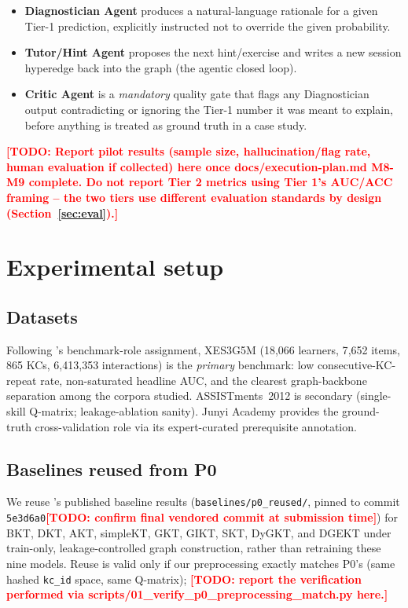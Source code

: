 \documentclass[journal]{IEEEtran}
\newcommand{\todo}[1]{\textcolor{red}{\textbf{[TODO: #1]}}}
\begin{document}
\begin{itemize}
  \item \textbf{Diagnostician Agent} produces a natural-language rationale
  for a given Tier-1 prediction, explicitly instructed not to override the
  given probability.
  \item \textbf{Tutor/Hint Agent} proposes the next hint/exercise and writes
  a new session hyperedge back into the graph (the agentic closed loop).
  \item \textbf{Critic Agent} is a \emph{mandatory} quality gate that flags
  any Diagnostician output contradicting or ignoring the Tier-1 number it
  was meant to explain, before anything is treated as ground truth in a
  case study.
\end{itemize}

\todo{Report pilot results (sample size, hallucination/flag rate, human
evaluation if collected) here once docs/execution-plan.md M8-M9 complete.
Do not report Tier 2 metrics using Tier 1's AUC/ACC framing -- the two tiers
use different evaluation standards by design (Section~\ref{sec:eval}).}

\section{Experimental setup}

\subsection{Datasets}
\label{sec:reuse}
Following \cite{daominh2026p0}'s benchmark-role assignment, XES3G5M
\cite{liu2023xes3g5m} (18{,}066 learners, 7{,}652 items, 865 KCs,
6{,}413{,}353 interactions) is the \emph{primary} benchmark: low
consecutive-KC-repeat rate, non-saturated headline AUC, and the clearest
graph-backbone separation among the corpora \cite{daominh2026p0} studied.
ASSISTments~2012 is secondary (single-skill Q-matrix; leakage-ablation
sanity). Junyi Academy provides the ground-truth cross-validation role via
its expert-curated prerequisite annotation.

\subsection{Baselines reused from P0}
We reuse \cite{daominh2026p0}'s published baseline results
(\texttt{baselines/p0\_reused/}, pinned to commit
\texttt{5e3d6a0}\todo{confirm final vendored commit at submission time}) for
BKT, DKT, AKT, simpleKT, GKT, GIKT, SKT, DyGKT, and DGEKT under train-only,
leakage-controlled graph construction, rather than retraining these nine
models. Reuse is valid only if our preprocessing exactly matches P0's (same
hashed \texttt{kc\_id} space, same Q-matrix); \todo{report the verification
performed via scripts/01\_verify\_p0\_preprocessing\_match.py here.}
\end{document}
